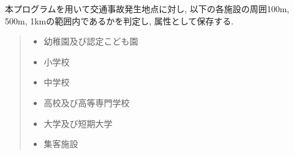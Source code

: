 \documentclass[a4j,8.5pt, twocolumn,fleqn]{jbook}
\begin{document}
本プログラムを用いて交通事故発生地点に対し, 以下の各施設の周囲100m, 500m, 1kmの範囲内であるかを判定し, 属性として保存する. 
\begin{quote}
    \begin{itemize}
        \item 幼稚園及び認定こども園
        \item 小学校
        \item 中学校
        \item 高校及び高等専門学校
        \item 大学及び短期大学
        \item 集客施設
    \end{itemize}
\end{quote}

\end{document}
